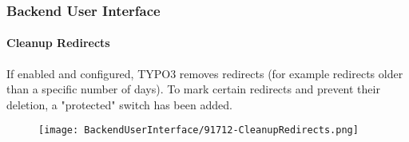 %

\begin{frame}[fragile]
	\frametitle{Backend User Interface}
	\framesubtitle{Cleanup Redirects}

	If enabled and configured, TYPO3 removes redirects (for example redirects
	older than a specific number of days).
	To mark certain redirects and prevent their deletion, a "protected" switch
	has been added.

	\begin{figure}
		\texttt{[image: BackendUserInterface/91712-CleanupRedirects.png]}
	\end{figure}

\end{frame}

